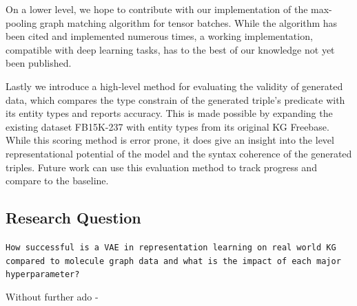 On a lower level, we hope to contribute with our implementation of the max-pooling graph matching algorithm for tensor batches. While the algorithm has been cited and implemented numerous times, a working implementation, compatible with deep learning tasks, has to the best of our knowledge not yet been published.  

Lastly we introduce a high-level method for evaluating the validity of generated data, which compares the type constrain of the generated triple's predicate with its entity types and reports accuracy. This is made possible by expanding the existing dataset FB15K-237 with entity types from its original KG Freebase. While this scoring method is error prone, it does give an insight into the level representational potential of the model and the syntax coherence of the generated triples. Future work can use this evaluation method to track progress and compare to the baseline. 



\subsection{Research Question}

\begin{center}
    \texttt{How successful is a VAE in representation learning on real world KG compared to molecule graph data and what is the impact of each major hyperparameter?}
    \label{sec1:requestion}
\end{center}


Without further ado -

